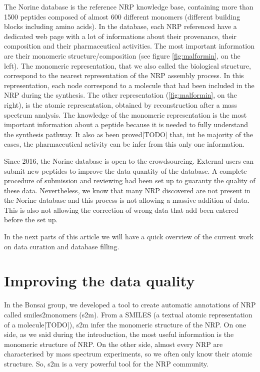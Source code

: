 \documentclass[long, final]{jobim2017}
\begin{document}
The Norine database is the reference NRP knowledge base, containing more than 1500 peptides composed of almost 600 different monomers (different building blocks including amino acids).
In the database, each NRP referenced have a dedicated web page with a lot of informations about their provenance, their composition and their pharmaceutical activities.
The most important information are their monomeric structure/composition (see figure \ref{fig:malformin}, on the left).
The monomeric representation, that we also called the biological structure, correspond to the nearest representation of the NRP assembly process.
In this representation, each node correspond to a molecule that had been included in the NRP during the synthesis.
The other representation (\ref{fig:malformin}, on the right), is the atomic representation, obtained by reconstruction after a mass spectrum analysis.
The knowledge of the monomeric representation is the most important information about a peptide because it is needed to fully understand the synthesis pathway.
It also as been proved[TODO] that, int he majority of the cases, the pharmaceutical activity can be infer from this only one information.

Since 2016, the Norine database is open to the crowdsourcing.
External users can submit new peptides to improve the data quantity of the database.
A complete procedure of submission and reviewing had been set up to guaranty the quality of these data.
Nevertheless, we know that many NRP discovered are not present in the Norine database and this process is not allowing a massive addition of data.
This is also not allowing the correction of wrong data that add been entered before the set up.

In the next parts of this article we will have a quick overview of the current work on data curation and database filling.


\section{Improving the data quality}

In the Bonsai group, we developed a tool to create automatic annotations of NRP called smiles2monomers (s2m).
From a SMILES (a textual atomic representation of a molecule[TODO]), s2m infer the monomeric structure of the NRP.
On one side, as we said during the introduction, the most useful information is the monomeric structure of NRP.
On the other side, almost every NRP are characterised by mass spectrum experiments, so we often only know their atomic structure.
So, s2m is a very powerful tool for the NRP community.
\end{document}
